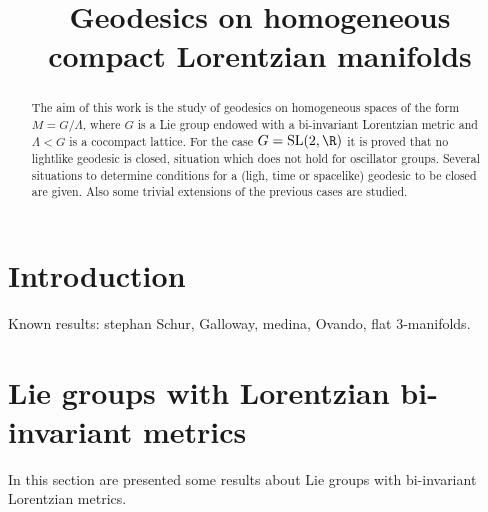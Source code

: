 \documentclass[11pt]{amsart}
\theoremstyle{plain}
\theoremstyle{definition}
\theoremstyle{remark}
\begin{document}
 	
 
\title[Geodesics on compact Lorentzian manifolds]{Geodesics on homogeneous compact Lorentzian manifolds}

\begin{abstract}
	The aim of this work is the study of geodesics on homogeneous spaces of the form $M=G/\Lambda$, where $G$ is a Lie group endowed with a bi-invariant Lorentzian metric and $\Lambda < G$ is a cocompact lattice. For the case $G=\operatorname{SL}(2,\R)$ it is proved that no lightlike geodesic is closed, situation which does not hold for oscillator groups. Several situations to determine conditions for a (ligh, time or spacelike) geodesic to be closed are given. Also some trivial extensions of the previous cases are studied.
\end{abstract}

\author{}

\let\today\relax  %


\maketitle




\section{Introduction}

Known results: stephan Schur, Galloway, medina, Ovando, flat 3-manifolds.


\section{Lie groups with Lorentzian bi-invariant metrics}\label{preeliminares}
In this section are presented some results about Lie groups with bi-invariant Lorentzian metrics.\\ 
\end{document}
